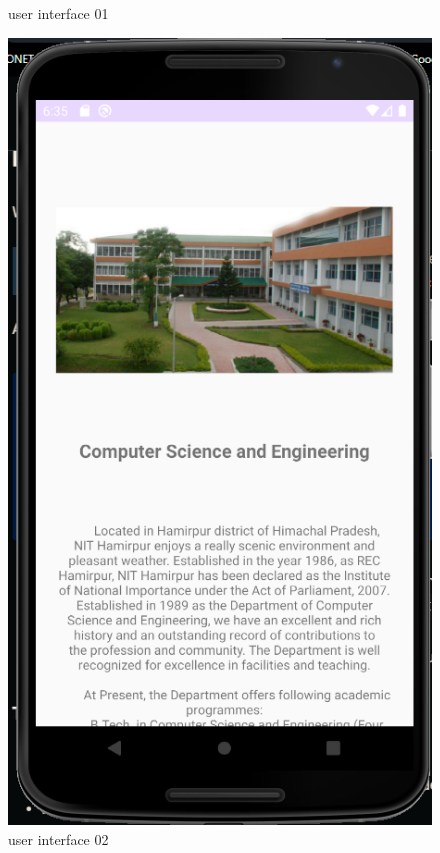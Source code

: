 \documentclass[11pt,a4paper]{report}
\begin{document}
\begin{figure}[H]
\begin{minipage}[b]{0.4\textwidth}
    \caption{user interface 01}
  \end{minipage}
  \hfill
  \begin{minipage}[b]{0.4\textwidth}
    \includegraphics[width=\textwidth]{Capture2.png}
    \caption{user interface 02}
  \end{minipage}
\end{figure}

		\vskip 15cm
\end{document}
